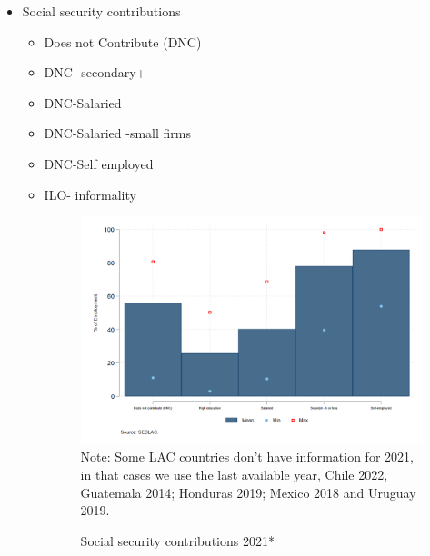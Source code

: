 \documentclass[english]{article}
\begin{document}
\begin{itemize}
 \item Social security contributions
    \begin{itemize}
        \item Does not Contribute (DNC) 
        \item DNC- secondary+
        \item DNC-Salaried
        \item DNC-Salaried -small firms
        \item DNC-Self employed
        \item ILO- informality
        \begin{figure}[!htb]
        \centering
        \caption{Social security contributions 2021*}     
        \includegraphics[scale=.3]{latex/figures/Snapshot/Social security contributions.png}
        \label{fig:SS contributions}
        \footnotesize{Note: Some LAC countries don’t have information for 2021, in that cases we use the last available year, Chile 2022, Guatemala 2014; Honduras 2019; Mexico 2018 and Uruguay 2019.}
        \end{figure}

        
    \end{itemize}



\end{itemize}
\end{document}
